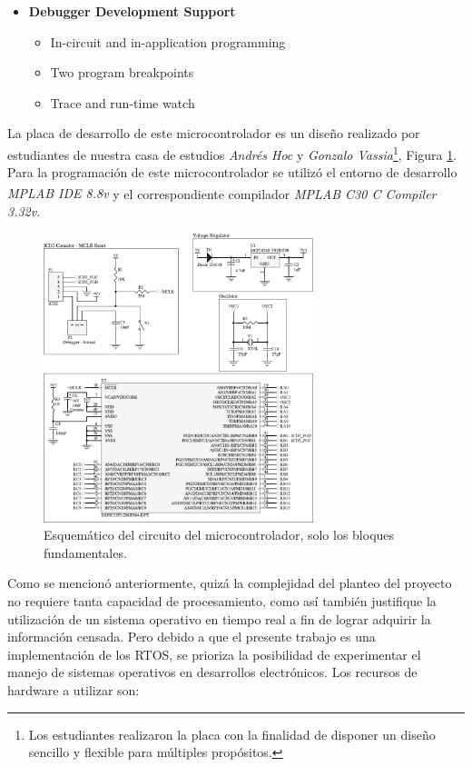 \documentclass[11pt,a4paper,oneside]{article}
\begin{document}
\begin{itemize}
\item [] \textbf{Debugger Development Support}
  \begin{itemize}
  \item In-circuit and in-application programming
  \item Two program breakpoints
  \item Trace and run-time watch
  \end{itemize}
  
\end{itemize}
            
La placa de desarrollo de este microcontrolador es un diseño realizado por estudiantes de nuestra casa de estudios \emph{Andrés Hoc} y \emph{Gonzalo Vassia}\footnote{Los estudiantes realizaron la placa con la finalidad de disponer un diseño sencillo y flexible para múltiples propósitos.}, Figura \ref{fig:circuito-dspic}. Para la programación de este microcontrolador se utilizó el entorno de desarrollo \emph{MPLAB\textsuperscript{\textregistered} IDE 8.8v} y el correspondiente compilador \emph{MPLAB C30 C Compiler 3.32v}.

\begin{figure}[h]
  \centering
  \includegraphics[width=0.7\textwidth]{images/dspic-placa}
  \caption{Esquemático del circuito del microcontrolador, solo los bloques fundamentales.}
  \label{fig:circuito-dspic}
\end{figure}

Como se mencionó anteriormente, quizá la complejidad del planteo del proyecto no requiere tanta capacidad de procesamiento, como así también justifique la utilización de un sistema operativo en tiempo real a fin de lograr adquirir la información censada. Pero debido a que el presente trabajo es una implementación de los RTOS, se prioriza la posibilidad de experimentar el manejo de sistemas operativos en desarrollos electrónicos. Los recursos de hardware a utilizar son:
\end{document}
